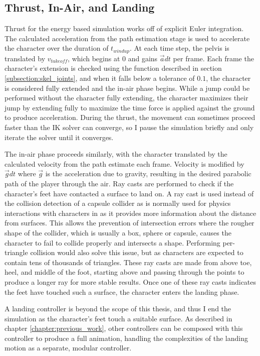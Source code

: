 \subsection{Thrust, In-Air, and Landing}
\label{subsection:energy_thrust}
Thrust for the energy based simulation works off of explicit Euler integration.  The calculated acceleration from the path estimation stage is used to accelerate the character over the duration of $t_{windup}$.  At each time step, the pelvis is translated by $v_{takeoff}$, which begins at 0 and gains $\vec{a} dt$ per frame.  Each frame the character's extension is checked using the function described in section \ref{subsection:skel_joints}, and when it falls below a tolerance of $0.1$, the character is considered fully extended and the in-air phase begins.  While a jump could be performed without the character fully extending, the character maximizes their jump by extending fully to maximize the time force is applied against the ground to produce acceleration.  During the thrust, the movement can sometimes proceed faster than the IK solver can converge, so I pause the simulation briefly and only iterate the solver until it converges.

The in-air phase proceeds similarly, with the character translated by the calculated velocity from the path estimate each frame.  Velocity is modified by $\vec{g} dt$ where $\vec{g}$ is the acceleration due to gravity, resulting in the desired parabolic path of the player through the air.  Ray casts are performed to check if the character's feet have contacted a surface to land on.  A ray cast is used instead of the collision detection of a capsule collider as is normally used for physics interactions with characters in \unity{} as it provides more information about the distance from surfaces.  This allows the prevention of intersection errors where the rougher shape of the collider, which is usually a box, sphere or capsule, causes the character to fail to collide properly and intersects a shape.  Performing per-triangle collision would also solve this issue, but as characters are expected to contain tens of thousands of triangles.  These ray casts are made from above toe, heel, and middle of the foot, starting above and passing through the points to produce a longer ray for more stable results.  Once one of these ray casts indicates the feet have touched such a surface, the character enters the landing phase.

A landing controller is beyond the scope of this thesis, and thus I end the simulation as the character's feet touch a suitable surface.  As described in chapter \ref{chapter:previous_work}, other controllers can be composed with this controller to produce a full animation, handling the complexities of the landing motion as a separate, modular controller.



